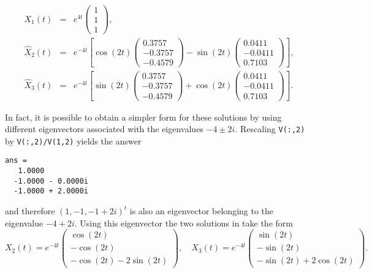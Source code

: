 \documentclass{ximera}
\begin{document}
\begin{eqnarray*}
X_1(t) & = & e^{4t}\left(\begin{array}{r} 1\\1\\1\end{array}\right),\\
\widehat{X}_2(t) & = & e^{-4t}\left[
\cos(2t)\left(\begin{array}{r}0.3757\\-0.3757\\-0.4579\end{array}\right)
-\sin(2t)\left(\begin{array}{r} 0.0411\\-0.0411\\0.7103\end{array}\right)
\right],\\
\widehat{X}_3(t) & = & e^{-4t}\left[
\sin(2t)\left(\begin{array}{r}0.3757\\-0.3757\\-0.4579\end{array}\right)
+\cos(2t)\left(\begin{array}{r} 0.0411\\-0.0411\\0.7103\end{array}\right)
\right].
\end{eqnarray*}


In fact, it is possible to obtain a simpler form for these solutions by 
using different eigenvectors associated with the eigenvalues $-4\pm 2i$.  
Rescaling {\tt V(:,2)} by {\tt V(:,2)/V(1,2)} yields the answer
\begin{verbatim}
ans =
   1.0000
  -1.0000 - 0.0000i
  -1.0000 + 2.0000i
\end{verbatim}
and therefore $(1,-1,-1+2i)^t$ is also an eigenvector belonging to the
eigenvalue $-4+2i$.  Using this eigenvector the two solutions in 
 take the form
\[
X_2(t) = e^{-4t}\left(\begin{array}{c}
\cos(2t)\\ -\cos(2t)\\ -\cos(2t)-2\sin(2t)\end{array}\right),\quad
X_3(t) = e^{-4t}\left(\begin{array}{c}
\sin(2t)\\ -\sin(2t)\\ -\sin(2t)+2\cos(2t)\end{array}\right).
\]
\end{document}
